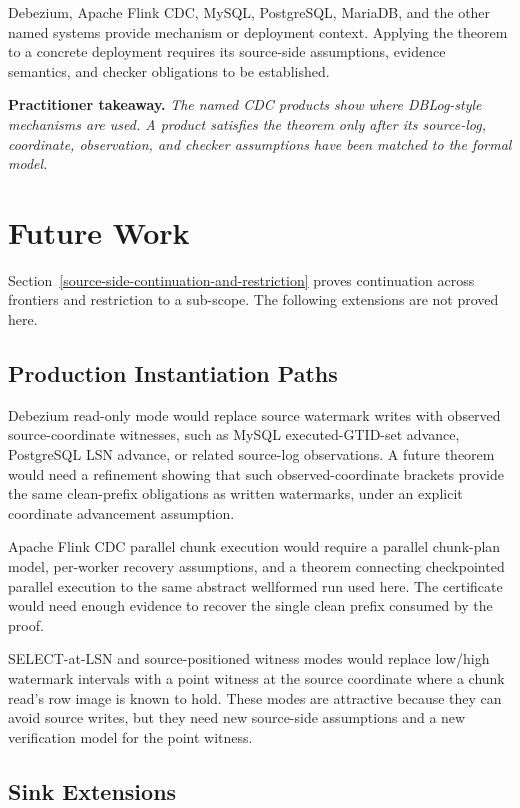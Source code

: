 \documentclass[letterpaper,10pt,twocolumn]{article}
\begin{document}
Debezium, Apache Flink CDC, MySQL, PostgreSQL, MariaDB, and the other
named systems provide mechanism or deployment context. Applying the
theorem to a concrete deployment requires its source-side assumptions,
evidence semantics, and checker obligations to be established.

\smallskip
\noindent\textbf{Practitioner takeaway.} \emph{The named CDC products
show where DBLog-style mechanisms are used. A product satisfies the
theorem only after its source-log, coordinate, observation, and checker
assumptions have been matched to the formal model.}

\section{Future Work}\label{future-work}

Section~\ref{source-side-continuation-and-restriction} proves
continuation across frontiers and restriction to a sub-scope. The
following extensions are not proved here.

\subsection{Production Instantiation
Paths}\label{production-instantiation-paths}

Debezium read-only mode would replace source watermark writes with
observed source-coordinate witnesses, such as MySQL executed-GTID-set
advance, PostgreSQL LSN advance, or related source-log observations. A future
theorem would need a refinement showing that such observed-coordinate
brackets provide the same clean-prefix obligations as written
watermarks, under an explicit coordinate advancement assumption.

Apache Flink CDC parallel chunk execution would require a parallel
chunk-plan model, per-worker recovery assumptions, and a theorem
connecting checkpointed parallel execution to the same abstract
wellformed run used here. The certificate would need enough evidence to
recover the single clean prefix consumed by the proof.

SELECT-at-LSN and source-positioned witness modes would replace low/high
watermark intervals with a point witness at the source coordinate where
a chunk read's row image is known to hold. These modes are attractive
because they can avoid source writes, but they need new source-side
assumptions and a new verification model for the point witness.

\subsection{Sink Extensions}\label{sink-extensions}
\end{document}
